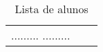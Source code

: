 \documentclass[12pt]{article}
\begin{document}
\begin{table}
\caption{Lista de alunos}
\begin{tabular}{lcr} 

.........
.........

\end{tabular}
\label{tabA}\end{table}
\end{document}
